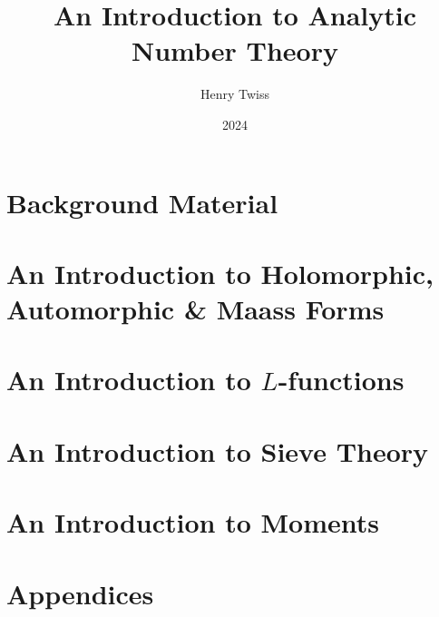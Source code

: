\documentclass[12pt,oneside]{book}
\title{An Introduction to Analytic Number Theory}
\author{Henry Twiss}
\date{2024}
\begin{document}
\maketitle
\pagestyle{empty}
\tableofcontents
\setcounter{page}{0}
\pagestyle{fancy}

\part{Background Material}
  

\part{An Introduction to Holomorphic, Automorphic \& Maass Forms}
  
  
  
  

\part{An Introduction to \texorpdfstring{$L$}{L}-functions}
  
  
  

\part{An Introduction to Sieve Theory}
  
  

\part{An Introduction to Moments}
  
  

\part{Appendices}
  

\printindex


\end{document}
